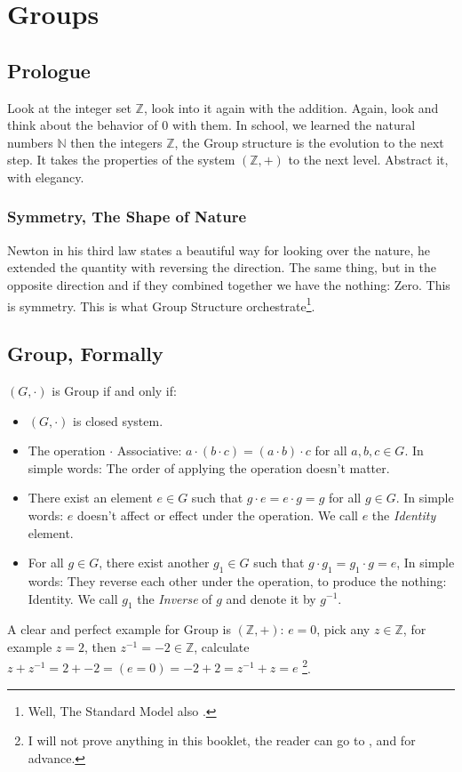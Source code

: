 \section{Groups \label{group}}
\subsection{Prologue}
Look at the integer set $\mathbb{Z}$, look into it again with the addition. Again, look and think about the behavior of $0$ with them. In school, we learned the natural numbers $\mathbb{N}$ then the integers $\mathbb{Z}$, the Group structure is the evolution to the next step. It takes the properties of the system $(\mathbb{Z},+)$ to the next level. Abstract it, with elegancy.

\subsubsection{Symmetry, The Shape of Nature}
Newton in his third law states a beautiful way for looking over the nature, he extended the quantity with reversing the direction. The same thing, but in the opposite direction and if they combined together we have the nothing: Zero. This is symmetry. This is what Group Structure orchestrate\footnote{Well, The Standard Model also \cite{enwiki:1038581383}.}.

\subsection{Group, Formally}

$(G,\cdot)$ is Group if and only if:
\begin{itemize}
   \item $(G,\cdot)$ is closed system.
   \item The operation $\cdot$ Associative: $a \cdot (b \cdot c) = (a \cdot b) \cdot c$ for all $a,b,c \in G$. In simple words: The order of applying the operation doesn't matter.
   \item There exist an element $e \in G$ such that $g \cdot e = e \cdot g = g$ for all $g \in G$. In simple words: $e$ doesn't affect or effect under the operation. We call $e$ the {\it Identity} element.
   \item For all $g \in G$, there exist another $g_1 \in G$ such that $g \cdot g_1 = g_1 \cdot g = e$, In simple words: They reverse each other under the operation, to produce the nothing: Identity. We call $g_1$ the {\it Inverse} of $g$ and denote it by $g^{-1}$.
\end{itemize}
A clear and perfect example for Group is $(\mathbb{Z},+)$: $e = 0$, pick any $z \in \mathbb{Z}$, for example $z = 2$, then $z^{-1}=-2 \in \mathbb{Z}$, calculate $z + z^{-1} = 2 + -2 = ( e = 0 ) = -2 + 2 = z^{-1} + z = e$ \footnote{I will not prove anything in this booklet, the reader can go to  \cite{fraleigh2003a}, and \cite{beardon2005algebra} for advance.}.

